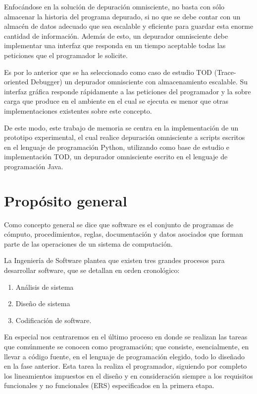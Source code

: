 \documentclass[12pt,legalpaper]{report}
\begin{document}
Enfocándose en la solución de depuración omnisciente, no basta con sólo almacenar la historia del programa depurado, si no que se debe contar con un almacén de datos adecuado que sea escalable y eficiente para guardar esta enorme cantidad de información.  Además de esto, un depurador omnisciente debe implementar una interfaz que responda en un tiempo aceptable todas las peticiones que el programador le solicite.

Es por lo anterior que se ha seleccionado como caso de estudio TOD (Trace-oriented Debugger) \cite{tod} un depurador omnisciente con almacenamiento escalable.  Su interfaz gráfica responde rápidamente a las peticiones del programador y la sobre carga que produce en el ambiente en el cual se ejecuta es menor que otras implementaciones existentes sobre este concepto.

De este modo, este trabajo de memoria se centra en la implementación de un prototipo experimental, el cual realice depuración omnisciente a scripts escritos en el lenguaje de programación Python, utilizando como base de estudio e implementación TOD, un depurador omnisciente escrito en el lenguaje de programación Java.

\chapter{Propósito general}

Como concepto general se dice que software es el conjunto de programas de cómputo, procedimientos, reglas, documentación y datos asociados que forman parte de las operaciones de un sistema de computación. \cite{ieee}

La Ingeniería de Software plantea que existen tres grandes procesos para desarrollar software, que se detallan en orden cronológico:
\begin{enumerate}
	\item Análisis de sistema
	\item Diseño de sistema
	\item Codificación de software.
\end{enumerate}

En especial nos centraremos en el último proceso en donde se realizan las tareas que comúnmente se conocen como programación; que consiste, esencialmente, en llevar a código fuente, en el lenguaje de programación elegido, todo lo diseñado en la fase anterior. Esta tarea la realiza el programador, siguiendo por completo los lineamientos impuestos en el diseño y en consideración siempre a los requisitos funcionales y no funcionales (ERS) especificados en la primera etapa.
\end{document}
